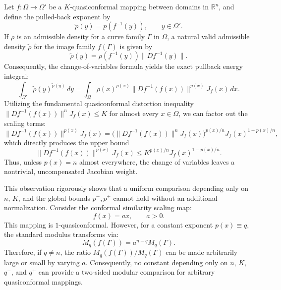 \documentclass[12pt]{amsart}
\numberwithin{equation}{section}
\theoremstyle{plain}
\theoremstyle{definition}
\begin{document}
Let $f:\Omega\to\Omega'$ be a $K$-quasiconformal mapping between domains in $\mathbb R^n$, and define the pulled-back exponent by
\begin{equation*}
\widetilde p(y)=p(f^{-1}(y)), \qquad y\in\Omega'.
\end{equation*}
If $\rho$ is an admissible density for a curve family $\Gamma$ in $\Omega$, a natural valid admissible density $\widetilde\rho$ for the image family $f(\Gamma)$ is given by
\begin{equation*}
\widetilde\rho(y) = \rho(f^{-1}(y)) \|Df^{-1}(y)\|.
\end{equation*}
Consequently, the change-of-variables formula yields the exact pullback energy integral:
\begin{equation*}
\int_{\Omega'} \widetilde\rho(y)^{\widetilde p(y)}\,dy = \int_{\Omega} \rho(x)^{p(x)} \|Df^{-1}(f(x))\|^{p(x)} J_f(x)\,dx.
\end{equation*}
Utilizing the fundamental quasiconformal distortion inequality $\|Df^{-1}(f(x))\|^n J_f(x)\le K$ for almost every $x\in\Omega$, we can factor out the scaling terms:
\begin{equation*}
\|Df^{-1}(f(x))\|^{p(x)}J_f(x) = \bigl( \|Df^{-1}(f(x))\|^nJ_f(x) \bigr)^{p(x)/n} J_f(x)^{1-p(x)/n},
\end{equation*}
which directly produces the upper bound
\begin{equation*}
\|Df^{-1}(f(x))\|^{p(x)}J_f(x) \le K^{p(x)/n} J_f(x)^{1-p(x)/n}.
\end{equation*}
Thus, unless $p(x)=n$ almost everywhere, the change of variables leaves a nontrivial, uncompensated Jacobian weight.

This observation rigorously shows that a uniform comparison depending only on $n$, $K$, and the global bounds $p^-,p^+$ cannot hold without an additional normalization. Consider the conformal similarity scaling map:
\begin{equation*}
f(x)=a x, \qquad a>0.
\end{equation*}
This mapping is $1$-quasiconformal. However, for a constant exponent $p(x)\equiv q$, the standard modulus transforms via:
\begin{equation*}
M_q(f(\Gamma)) = a^{n-q} M_q(\Gamma).
\end{equation*}
Therefore, if $q\ne n$, the ratio $M_q(f(\Gamma))/M_q(\Gamma)$ can be made arbitrarily large or small by varying $a$. Consequently, no constant depending only on $n$, $K$, $q^-$, and $q^+$ can provide a two-sided modular comparison for arbitrary quasiconformal mappings.
\end{document}
